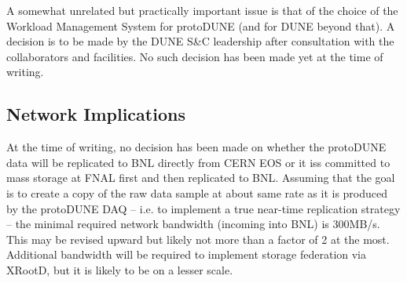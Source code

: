 \documentclass[pdftex,12pt,letter]{article}
\begin{document}
A somewhat unrelated but practically important issue is that of the choice of the Workload Management System for protoDUNE
(and for DUNE beyond that).
A decision is to be made by the DUNE S\&C leadership after consultation with the collaborators and facilities. No such decision has
been made yet at the time of writing.

\subsection{Network Implications}
At the time of writing, no decision has been made on whether the protoDUNE data will be replicated to BNL directly from CERN
EOS  or it iss committed to mass storage at FNAL first and then replicated to BNL. Assuming that the goal is to create a copy of
the raw data sample at about same rate as it is produced by the protoDUNE DAQ -- i.e. to implement a true near-time replication strategy --
the minimal required network bandwidth (incoming into
BNL) is 300MB/s. This may be revised upward but likely not more than a factor of 2 at the most. Additional bandwidth will be required
to implement storage federation via XRootD, but it is likely to be on a lesser scale.
\end{document}
